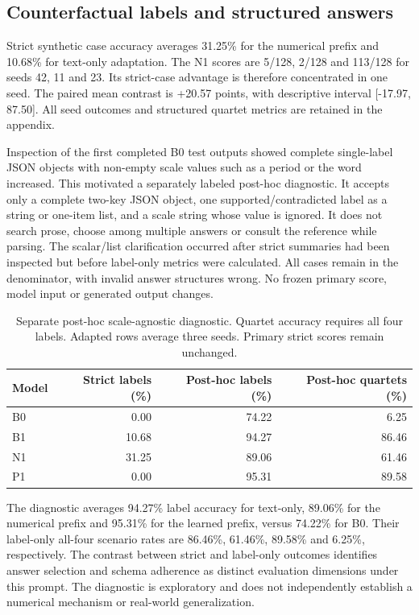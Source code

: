\documentclass[11pt,a4paper]{article}
\begin{document}
\subsection{Counterfactual labels and structured answers}
Strict synthetic case accuracy averages 31.25\% for the numerical prefix and 10.68\% for text-only adaptation. The N1 scores are 5/128, 2/128 and 113/128 for seeds 42, 11 and 23. Its strict-case advantage is therefore concentrated in one seed. The paired mean contrast is +20.57 points, with descriptive interval [-17.97, 87.50]. All seed outcomes and structured quartet metrics are retained in the appendix.

Inspection of the first completed B0 test outputs showed complete single-label JSON objects with non-empty scale values such as a period or the word increased. This motivated a separately labeled post-hoc diagnostic. It accepts only a complete two-key JSON object, one supported/contradicted label as a string or one-item list, and a scale string whose value is ignored. It does not search prose, choose among multiple answers or consult the reference while parsing. The scalar/list clarification occurred after strict summaries had been inspected but before label-only metrics were calculated. All cases remain in the denominator, with invalid answer structures wrong. No frozen primary score, model input or generated output changes.

\begin{table}[htbp]\centering\small\begin{tabular}{lrrr}\toprule
Model & Strict labels (\%) & Post-hoc labels (\%) & Post-hoc quartets (\%) \\ \midrule
B0 & 0.00 & 74.22 & 6.25 \\
B1 & 10.68 & 94.27 & 86.46 \\
N1 & 31.25 & 89.06 & 61.46 \\
P1 & 0.00 & 95.31 & 89.58 \\
\bottomrule\end{tabular}\caption{Separate post-hoc scale-agnostic diagnostic. Quartet accuracy requires all four labels. Adapted rows average three seeds. Primary strict scores remain unchanged.}\label{tab:schema}\end{table}
The diagnostic averages 94.27\% label accuracy for text-only, 89.06\% for the numerical prefix and 95.31\% for the learned prefix, versus 74.22\% for B0. Their label-only all-four scenario rates are 86.46\%, 61.46\%, 89.58\% and 6.25\%, respectively. The contrast between strict and label-only outcomes identifies answer selection and schema adherence as distinct evaluation dimensions under this prompt. The diagnostic is exploratory and does not independently establish a numerical mechanism or real-world generalization.
\end{document}
